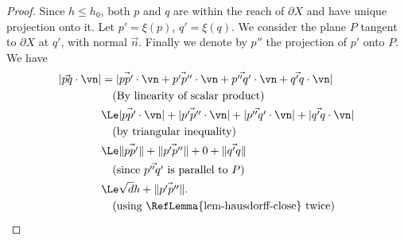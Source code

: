 \begin{proof}
    Since $h \le h_0$, both $p$ and $q$ are within the reach of
    $\partial X$ and have unique projection onto it. Let $p'=\xi(p)$,
    $q'=\xi(q)$. We consider the plane $P$ tangent to $\partial X$ at
    $q'$, with normal $\vec{n}$. Finally we denote by $p''$ the
    projection of $p'$ onto $P$. We have
    \begin{align*}
        | \vec{pq} \cdot \vn | & = | \vec{pp'} \cdot \vn  +  \vec{p'p''} \cdot \vn  + \vec{p''q'} \cdot \vn  +  \vec{q'q} \cdot \vn | \\
        & \quad \text{(By linearity of scalar product)}\\
        & \Le | \vec{pp'} \cdot \vn | + | \vec{p'p''} \cdot \vn | + |\vec{p''q'} \cdot \vn | + | \vec{q'q} \cdot \vn | \\
        & \quad \text{(by triangular inequality)} \\
        & \Le \| \vec{pp'} \| + \| \vec{p'p''} \| + 0 + \| \vec{q'q} \| \\
        & \quad \text{(since $\vec{p''q'}$ is parallel to $P$)}\\
        & \Le \sqrt{d}h + \| \vec{p'p''} \|. \\
        & \quad \text{(using \RefLemma{lem-hausdorff-close} twice)}
    \end{align*}


\end{proof}
